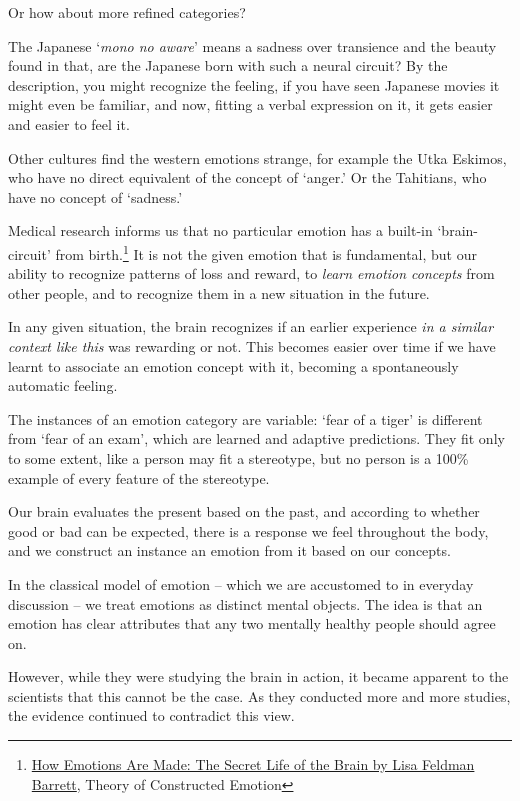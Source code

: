 Or how about more refined categories?

The Japanese `\emph{mono no aware}' means a sadness over transience and
the beauty found in that, are the Japanese born with such a neural
circuit? By the description, you might recognize the feeling, if you
have seen Japanese movies it might even be familiar, and now, fitting a
verbal expression on it, it gets easier and easier to feel it.

Other cultures find the western emotions strange, for example the Utka
Eskimos, who have no direct equivalent of the concept of `anger.' Or the
Tahitians, who have no concept of `sadness.'

Medical research informs us that no particular emotion has a built-in
`brain-circuit' from birth.\footnote{\href{https://www.goodreads.com/book/show/23719305-how-emotions-are-made}{How
  Emotions Are Made: The Secret Life of the Brain by Lisa Feldman
  Barrett}, Theory of Constructed Emotion} It is not the given emotion
that is fundamental, but our ability to recognize patterns of loss and
reward, to \emph{learn emotion concepts} from other people, and to
recognize them in a new situation in the future.

In any given situation, the brain recognizes if an earlier experience
\emph{in a similar context like this} was rewarding or not. This becomes
easier over time if we have learnt to associate an emotion concept with
it, becoming a spontaneously automatic feeling.

The instances of an emotion category are variable: `fear of a tiger' is
different from `fear of an exam', which are learned and adaptive
predictions. They fit only to some extent, like a person may fit a
stereotype, but no person is a 100\% example of every feature of the
stereotype.

Our brain evaluates the present based on the past, and according to
whether good or bad can be expected, there is a response we feel
throughout the body, and we construct an instance an emotion from it
based on our concepts.


In the classical model of emotion -- which we are accustomed to in
everyday discussion -- we treat emotions as distinct mental objects. The
idea is that an emotion has clear attributes that any two mentally
healthy people should agree on.

However, while they were studying the brain in action, it became
apparent to the scientists that this cannot be the case. As they
conducted more and more studies, the evidence continued to contradict
this view.


